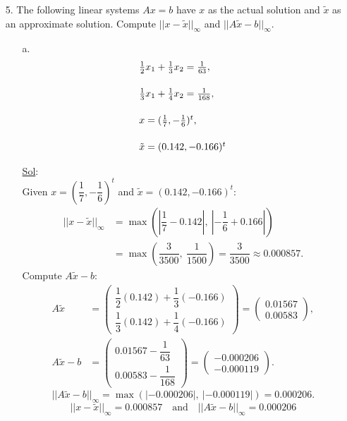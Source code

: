 \begin{enumerate}
  \item[5.] The following linear systems \(Ax = b\) have \(x\) as the
    actual solution and \(\tilde{x}\) as an approximate solution.
    Compute \(|| x - \tilde{x}||_\infty\) and \(||A \tilde{x} - b||_\infty\).
    \begin{enumerate}
      \item[a.] \[
          \begin{array}{l}
            \frac{1}{2} x_1 + \frac{1}{3} x_2 = \frac{1}{63}, \\
            \smallbreak \\
            \frac{1}{3} x_1 + \frac{1}{4} x_2 = \frac{1}{168}, \\
            \smallbreak \\
            x = (\frac{1}{7}, - \frac{1}{6})^t, \\
            \smallbreak \\
            \tilde{x} = (0.142, -0.166)^t
          \end{array}
        \]

        \underline{Sol}:\\
        Given \(x = \left(\dfrac{1}{7}, -\dfrac{1}{6}\right)^t\) and
        \(\tilde{x} = (0.142, -0.166)^t\):
        \[
          \begin{aligned}
            ||x - \tilde{x}||_\infty &= \max\left(\left|\dfrac{1}{7}
            - 0.142\right|,\ \left|-\dfrac{1}{6} + 0.166\right|\right) \\
            &= \max\left(\dfrac{3}{3500},\ \dfrac{1}{1500}\right) =
            \dfrac{3}{3500} \approx 0.000857.
          \end{aligned}
        \]
        Compute \(A\tilde{x} - b\):
        \[
          \begin{aligned}
            A\tilde{x} &=
            \begin{pmatrix}
              \dfrac{1}{2}(0.142) + \dfrac{1}{3}(-0.166) \\
              \dfrac{1}{3}(0.142) + \dfrac{1}{4}(-0.166)
            \end{pmatrix} =
            \begin{pmatrix} 0.01567 \\ 0.00583
            \end{pmatrix}, \\
            A\tilde{x} - b &=
            \begin{pmatrix} 0.01567 - \dfrac{1}{63} \\ 0.00583 - \dfrac{1}{168}
            \end{pmatrix} =
            \begin{pmatrix} -0.000206 \\ -0.000119
            \end{pmatrix}.
          \end{aligned}
        \]
        \[
          ||A\tilde{x} - b||_\infty = \max(|-0.000206|,\ |-0.000119|)
          = 0.000206.
        \]
        \[
          \boxed{||x - \tilde{x}||_\infty = 0.000857 \quad \text{and}
          \quad ||A\tilde{x} - b||_\infty = 0.000206}
        \]
    \end{enumerate}
\end{enumerate}

